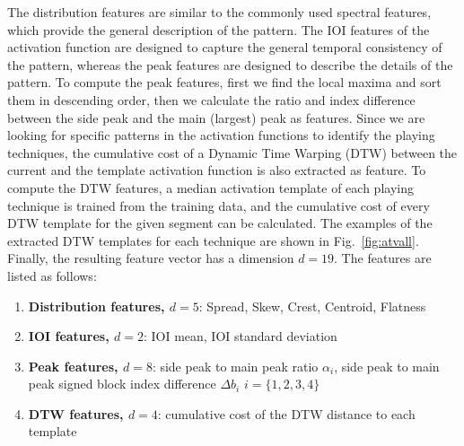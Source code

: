 \documentclass{article}
\begin{document}
{{{{{{{{{\color{red}{I don't like this structure. I would combine the enumerate with the text, maybe do a paragraph per feature category. Also, make sure the description is understandable; you could also provide a simple graph if that helps.}} The distribution features are similar to the commonly used spectral features, which provide the general description of the pattern. The IOI features of the activation function are designed to capture the general temporal consistency{\color{red}{I don't know what temporal consistency is captured here, what is that anyway?}} of the pattern, whereas the peak features are designed to describe the details of the pattern. To compute the peak features, first we find the local maxima and sort them in descending order, then we calculate the ratio and index difference between the side peak and the main (largest) peak as features. Since we are looking for specific patterns in the activation functions to identify the playing techniques, the cumulative cost of a Dynamic Time Warping (DTW) between the current and the template activation function is also extracted as feature. To compute the DTW features, a median activation template of each playing technique is trained from the training data, and the cumulative cost of every DTW template for the given segment can be calculated. The examples of the extracted DTW templates for each technique are shown in Fig.~\ref{fig:atvall}. Finally, the resulting feature vector has a dimension $d = 19$. The features are listed as follows: {\color{red}{reread the DTW description to see if it is understandble. note completely sure...}

\begin{enumerate}
	\item \textbf{Distribution features, $d = 5$}: Spread, Skew, Crest, Centroid, Flatness
	\item \textbf{IOI features, $d = 2$}: IOI mean, IOI standard deviation
	\item \textbf{Peak features, $d = 8$}: side peak to main peak ratio $\alpha_{i}$, side peak to main peak signed block index difference $\Delta b_{i}$ $i = \{1, 2, 3, 4\}$
	\item \textbf{DTW features, $d = 4$}: cumulative cost of the  DTW distance to each template {\color{red}{or something like this...}}\\
\end{enumerate}

}}}}}}}}}
\end{document}
